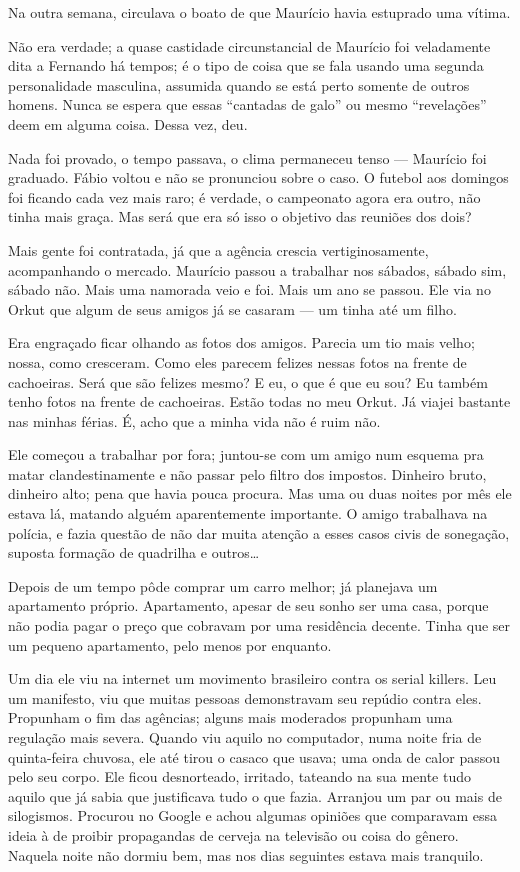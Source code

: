 Na outra semana, circulava o boato de que Maurício havia estuprado uma vítima.

Não era verdade; a quase castidade circunstancial de Maurício foi veladamente dita a Fernando há tempos; é o tipo de coisa que se fala usando uma segunda personalidade masculina, assumida quando se está perto somente de outros ho\-mens. Nunca se espera que essas ``cantadas de galo'' ou mesmo ``revelações'' deem em alguma coisa. Dessa vez, deu.

Nada foi provado, o tempo passava, o clima permaneceu tenso --- Maurício foi graduado. Fábio voltou e não se pronunciou sobre o caso. O futebol aos domingos foi ficando cada vez mais raro; é verdade, o campeonato agora era outro, não tinha mais graça. Mas será que era só isso o objetivo das reuniões dos dois?

Mais gente foi contratada, já que a agência crescia vertiginosamente, acompanhando o mercado. Maurício passou a trabalhar nos sábados, sábado sim, sábado não. Mais uma namorada veio e foi. Mais um ano se passou. Ele via no Orkut que algum de seus amigos já se casaram --- um tinha até um filho.

Era engraçado ficar olhando as fotos dos amigos. Parecia um tio mais velho; nossa, como cresceram. Como eles parecem felizes nessas fotos na frente de cachoeiras. Será que são felizes mesmo? E eu, o que é que eu sou? Eu também tenho fotos na frente de cachoeiras. Estão todas no meu Orkut. Já viajei bastante nas minhas férias. É, acho que a minha vida não é ruim não.

Ele começou a trabalhar por fora; juntou-se com um amigo num esquema pra matar clandestinamente e não passar pelo filtro dos impostos. Dinheiro bruto, dinheiro alto; pena que havia pouca procura. Mas uma ou duas noites por mês ele estava lá, matando alguém aparentemente importante. O amigo trabalhava na polícia, e fazia questão de não dar muita atenção a esses casos civis de sonegação, suposta formação de quadrilha e outros\ldots\,

Depois de um tempo pôde comprar um carro melhor; já planejava um apartamento próprio. Apartamento, apesar de seu sonho ser uma casa, porque não podia pagar o preço que cobravam por uma residência decente. Tinha que ser um pequeno apartamento, pelo menos por enquanto.

Um dia ele viu na internet um movimento brasileiro contra os serial killers. Leu um manifesto, viu que muitas pessoas demonstravam seu repúdio contra eles. Propunham o fim das agências; alguns mais moderados propunham uma regulação mais severa. Quando viu aquilo no computador, numa noite fria de quinta-feira chuvosa, ele até tirou o casaco que usava; uma onda de calor passou pelo seu corpo. Ele ficou desnorteado, irritado, tateando na sua mente tudo aquilo que já sabia que justificava tudo o que fazia. Arranjou um par ou mais de silogismos. Procurou no Google e achou algumas opiniões que comparavam essa ideia à de proibir propagandas de cerveja na televisão ou coisa do gênero. Naquela noite não dormiu bem, mas nos dias seguintes estava mais tranquilo.

